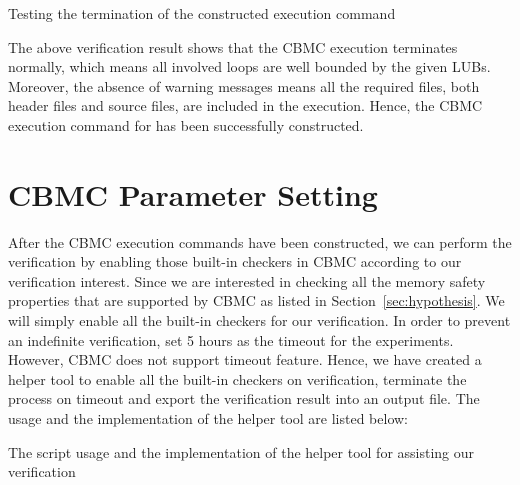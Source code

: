 \begin{listing}[H]
\caption{Testing the termination of the constructed execution command}
\end{listing}

The above verification result shows that the CBMC execution terminates normally, which means all involved loops are well bounded by the given LUBs. Moreover, the absence of warning messages means all the required files, both header files and source files, are included in the execution. Hence, the CBMC execution command for  has been successfully constructed.

\section{CBMC Parameter Setting} \label{sec:cbmcps}
After the CBMC execution commands have been constructed, we can perform the verification by enabling those built-in checkers in CBMC according to our verification interest. Since we are interested in checking all the memory safety properties that are supported by CBMC as listed in Section~\ref{sec:hypothesis}. We will simply enable all the built-in checkers for our verification. In order to prevent an indefinite verification, set 5 hours as the timeout for the experiments. However, CBMC does not support timeout feature. Hence, we have created a helper tool to enable all the built-in checkers on verification, terminate the process on timeout and export the verification result into an output file. The usage and the implementation of the helper tool are listed below:


\begin{listing}[ht]

\caption{The script usage and the implementation of the helper tool for assisting our verification}
\label{listing:3}
\end{listing}




